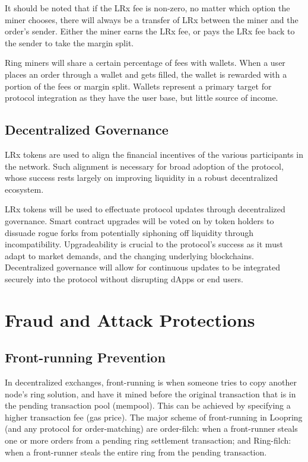 \documentclass[UTF8,nofonts]{article}
\begin{document}
\begin{multicols}{2}
It should be noted that if the LRx fee is non-zero, no matter which option the miner chooses, there will always be a transfer of LRx between the miner and the order's sender. Either the miner earns the LRx fee, or pays the LRx fee back to the sender to take the margin split.

Ring miners will share a certain percentage of fees with wallets. When a user places an order through a wallet and gets filled, the wallet is rewarded with a portion of the fees or margin split. Wallets represent a primary target for protocol integration as they have the user base, but little source of income. 

\subsection{Decentralized Governance}
LRx tokens are used to align the financial incentives of the various participants in the network. Such alignment is necessary for broad adoption of the protocol, whose success rests largely on improving liquidity in a robust decentralized ecosystem.

LRx tokens will be used to effectuate protocol updates through decentralized governance. Smart contract upgrades will be voted on by token holders to dissuade rogue forks from potentially siphoning off liquidity through incompatibility. Upgradeability is crucial to the protocol's success as it must adapt to market demands, and the changing underlying blockchains. Decentralized governance will allow for continuous updates to be integrated securely into the protocol without disrupting dApps or end users.

\section{Fraud and Attack Protections}

\subsection{Front-running Prevention\label{sec:dual_authoring}}

In decentralized exchanges, front-running is when someone tries to copy another node's ring solution, and have it mined before the original transaction that is in the pending transaction pool (mempool). This can be achieved by specifying a higher transaction fee (gas price). The major scheme of front-running in Loopring (and any protocol for order-matching) are order-filch: when a front-runner steals one or more orders from a pending ring settlement transaction; and Ring-filch: when a front-runner steals the entire ring from the pending transaction.


\end{multicols}
\end{document}
